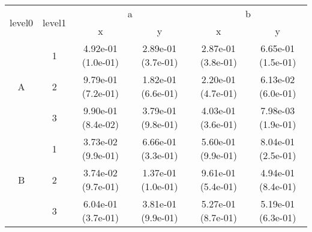 \begin{tabular}{cccccc}
\toprule
\multirow{2}{*}{level0} & \multirow{2}{*}{level1}&\multicolumn{2}{c}{a}&\multicolumn{2}{c}{b}\tabularnewline
\cmidrule(lr){3-4}
\cmidrule(lr){5-6}
&&x&y&x&y\tabularnewline
\midrule
\multirow{3}{*}{A}&1& 4.92e-01 (1.0e-01)& 2.89e-01 (3.7e-01)& 2.87e-01 (3.8e-01)& 6.65e-01 (1.5e-01)\tabularnewline
&2& 9.79e-01 (7.2e-01)& 1.82e-01 (6.6e-01)& 2.20e-01 (4.7e-01)& 6.13e-02 (6.0e-01)\tabularnewline
&3& 9.90e-01 (8.4e-02)& 3.79e-01 (9.8e-01)& 4.03e-01 (3.6e-01)& 7.98e-03 (1.9e-01)\tabularnewline
\midrule
\multirow{3}{*}{B}&1& 3.73e-02 (9.9e-01)& 6.66e-01 (3.3e-01)& 5.60e-01 (9.9e-01)& 8.04e-01 (2.5e-01)\tabularnewline
&2& 3.74e-02 (9.7e-01)& 1.37e-01 (1.0e-01)& 9.61e-01 (5.4e-01)& 4.94e-01 (8.4e-01)\tabularnewline
&3& 6.04e-01 (3.7e-01)& 3.81e-01 (9.9e-01)& 5.27e-01 (8.7e-01)& 5.19e-01 (6.3e-01)\tabularnewline
\bottomrule
\end{tabular}
